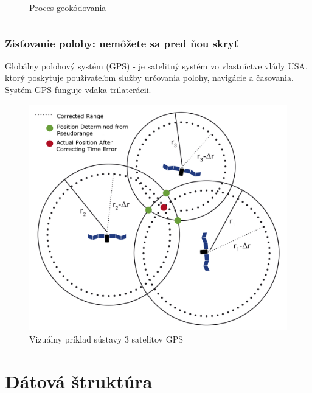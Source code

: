 \documentclass{beamer}
\begin{document}
\begin{frame}[fragile=singleslide]
\begin{columns}
\begin{column}{0.5\textwidth}
\begin{figure}[h]
		\caption{Proces geokódovania}
		\label{fig:geocoding}
	\end{figure}
	\end{column}
\end{columns}
\end{frame}

\begin{frame}[fragile=singleslide]\frametitle{Zisťovanie polohy: nemôžete sa pred ňou skryť}
Globálny polohový systém (GPS) - je satelitný systém vo vlastníctve vlády USA, ktorý poskytuje používateľom služby určovania polohy, navigácie a časovania. Systém GPS funguje vďaka trilaterácii.
\begin{figure}[h]
	\centering
	\includegraphics[scale=0.05]{diagram3.png}
	\caption{Vizuálny príklad sústavy 3 satelitov GPS}
	\label{fig:trilateration}
\end{figure}
\end{frame}

\section{Dátová štruktúra}
\end{document}
